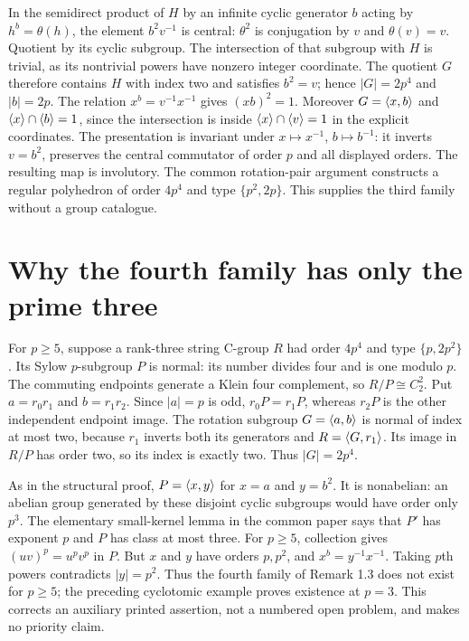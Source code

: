 In the semidirect product of $H$ by an infinite cyclic generator $b$
acting by $h^b=\theta(h)$, the element $b^2v^{-1}$ is central:
$\theta^2$ is conjugation by $v$ and $\theta(v)=v$.
Quotient by its cyclic subgroup. The intersection of that subgroup
with $H$ is trivial, as its nontrivial powers have nonzero integer
coordinate. The quotient $G$ therefore contains $H$ with index two
and satisfies $b^2=v$; hence $|G|=2p^4$ and $|b|=2p$.
The relation $x^b=v^{-1}x^{-1}$ gives $(xb)^2=1$.
Moreover $G=\langle x,b\rangle$ and $\langle x\rangle\cap\langle b\rangle=1$, since the
intersection is inside $\langle x\rangle\cap\langle v\rangle=1$ in the explicit coordinates.
The presentation is invariant under $x\mapsto x^{-1}$,
$b\mapsto b^{-1}$: it inverts $v=b^2$, preserves the central
commutator of order $p$ and all displayed orders.
The resulting map is involutory. The common rotation-pair argument constructs a
regular polyhedron of order $4p^4$ and type $\{p^2,2p\}$.
This supplies the third family without a group catalogue.

\section{Why the fourth family has only the prime three}
For $p\geq5$, suppose a rank-three string C-group $R$ had order
$4p^4$ and type $\{p,2p^2\}$. Its Sylow $p$-subgroup $P$
is normal: its number divides four and is one modulo $p$.
The commuting endpoints generate a Klein four complement, so
$R/P\cong C_2^2$. Put $a=r_0r_1$ and $b=r_1r_2$.
Since $|a|=p$ is odd, $r_0P=r_1P$, whereas $r_2P$ is the other
independent endpoint image. The rotation subgroup $G=\langle a,b\rangle$
is normal of index at most two, because $r_1$ inverts both its
generators and $R=\langle G,r_1\rangle$. Its image in $R/P$ has order two,
so its index is exactly two. Thus $|G|=2p^4$.

As in the structural proof, $P=\langle x,y\rangle$ for $x=a$ and $y=b^2$.
It is nonabelian: an abelian group generated by these disjoint cyclic
subgroups would have order only $p^3$. The elementary small-kernel
lemma in the common paper says that
$P'$ has exponent $p$ and $P$ has class at most three.
For $p\geq5$, collection gives $(uv)^p=u^pv^p$ in $P$.
But $x$ and $y$ have orders $p,p^2$, and
$x^b=y^{-1}x^{-1}$. Taking $p$th powers contradicts $|y|=p^2$.
Thus the fourth family of Remark 1.3 does not exist for $p\geq5$;
the preceding cyclotomic example proves existence at $p=3$.
This corrects an auxiliary printed assertion, not a numbered open
problem, and makes no priority claim.